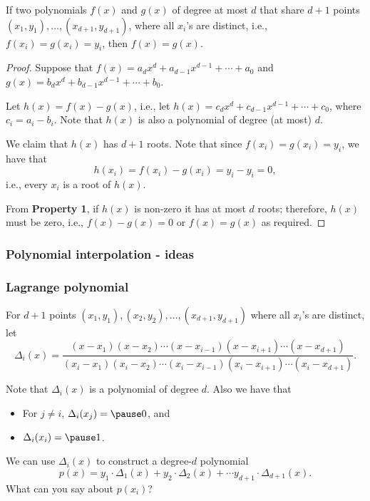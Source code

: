 \begin{frame}
  \begin{lemma}
    If two polynomials $f(x)$ and $g(x)$ of degree at most $d$ that
    share $d+1$ points $(x_1,y_1),\ldots,(x_{d+1},y_{d+1})$, where all
    $x_i$'s are distinct, i.e., $f(x_i)=g(x_i)=y_i$, then $f(x)=g(x)$.
    \label{lem:agree}
  \end{lemma}
  \begin{proof}
    {\small

      Suppose that $f(x)=a_dx^d+a_{d-1}x^{d-1}+\cdots+a_0$ and
      $g(x)=b_dx^d+b_{d-1}x^{d-1}+\cdots+b_0$.
      
      Let $h(x)=f(x)-g(x)$, i.e., let
      $h(x)=c_dx^d+c_{d-1}x^{d-1}+\cdots+c_0$, where $c_i=a_i-b_i$.
      Note that $h(x)$ is also a polynomial of degree (at most) $d$.

      We claim that $h(x)$ has $d+1$ roots.  Note that since
      $f(x_i)=g(x_i)=y_i$, we have that
      \[
      h(x_i)=f(x_i)-g(x_i)=y_i-y_i=0,
      \]
      i.e., every $x_i$ is a root of $h(x)$.

      From {\bf Property 1}, if $h(x)$ is non-zero it has at most $d$
      roots; therefore, $h(x)$ must be zero, i.e., $f(x)-g(x)=0$ or
      $f(x)=g(x)$ as required.
    }
  \end{proof}
  
\end{frame}

\begin{frame}
  \frametitle{Polynomial interpolation - ideas}
\end{frame}

\begin{frame}
  \frametitle{Lagrange polynomial}

  \begin{tcolorbox}
    For $d+1$ points $(x_1,y_1), (x_2,y_2),\ldots, (x_{d+1},y_{d+1})$
    where all $x_i$'s are distinct, let
    {\footnotesize
    \[
    \Delta_i(x) =
    \frac{(x-x_1)(x-x_2)\cdots(x-x_{i-1})(x-x_{i+1})\cdots(x-x_{d+1})}
         {(x_i-x_1)(x_i-x_2)\cdots(x_i-x_{i-1})(x_i-x_{i+1})\cdots(x_i-x_{d+1})}.
         \]
         }
  \end{tcolorbox}

  Note that $\Delta_i(x)$ is a polynomial of degree \pause $d$.
  Also we have that
  \begin{itemize}
  \item For $j\neq i$, $\Delta_i(x_j) = \pause 0$, and
  \item $\Delta_i(x_i) = \pause 1$.
  \end{itemize}
  \pause
  \vspace{0.2in}
  We can use $\Delta_i(x)$ to construct a degree-$d$ polynomial
  \[
  p(x) =
  y_1\cdot\Delta_1(x) +
  y_2\cdot\Delta_2(x) + \cdots
  y_{d+1}\cdot\Delta_{d+1}(x).
  \]
  What can you say about $p(x_i)$? 
\end{frame}

